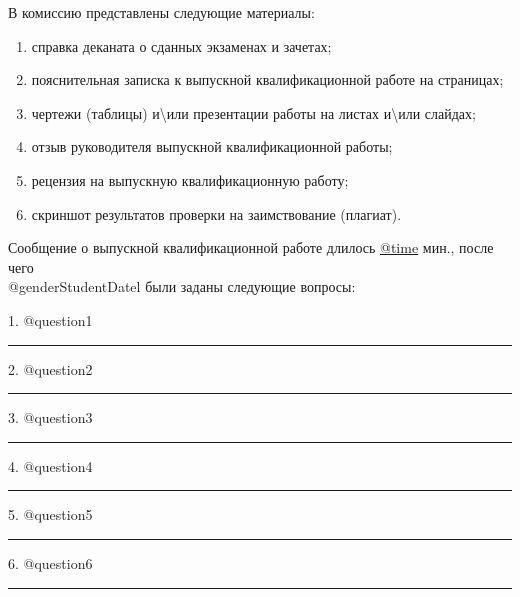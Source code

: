 \documentclass[a4paper,12pt]{article} %
\begin{document}
\hspace{-0.25cm}В комиссию представлены следующие материалы:
\vspace{-0.25cm}
\begin{enumerate}	
	\item  	справка деканата о сданных экзаменах и зачетах;
	\vspace{-0.3cm}
	\item  	пояснительная записка к выпускной квалификационной работе на \makebox[10mm]{\hrulefill} страницах;
	\vspace{-0.3cm}
	\item   чертежи (таблицы) и\textbackslash{}или презентации работы на \makebox[10mm]{\hrulefill}		 листах и\textbackslash{}или 	\makebox[10mm]{\hrulefill}		слайдах;
	\vspace{-0.3cm}
	\item 	отзыв руководителя выпускной квалификационной работы;
	\vspace{-0.3cm}
	\item	рецензия на выпускную квалификационную работу;
	\vspace{-0.3cm}
	\item  	скриншот результатов проверки на заимствование (плагиат).
\end{enumerate}

\hspace{-0.15cm}Сообщение о выпускной квалификационной работе длилось \underline{@time} мин., после чего\\
 @genderStudentDatel были заданы следующие вопросы:\\
\vspace{-0.5cm} 
\begin{flushleft}
	  	1. @question1
	  	\smallskip\hrule
	  	\vspace{0.3cm} 
	  	2. @question2
	  	\smallskip\hrule
	  	\vspace{0.3cm}
	  	3. @question3 
	  	\smallskip\hrule
	  	\vspace{0.3cm} 
	  	4. @question4
	  	\smallskip\hrule
	  	\vspace{0.3cm} 
	  	5. @question5
	  	\smallskip\hrule
	  	\vspace{0.3cm} 
	  	6. @question6
	  	\smallskip\hrule
	  	\vspace{0.3cm} 	 	
	  	
\end{flushleft}

\pagebreak

\hfill \break
\hfill \break
\thispagestyle{empty}
 
\end{document}
